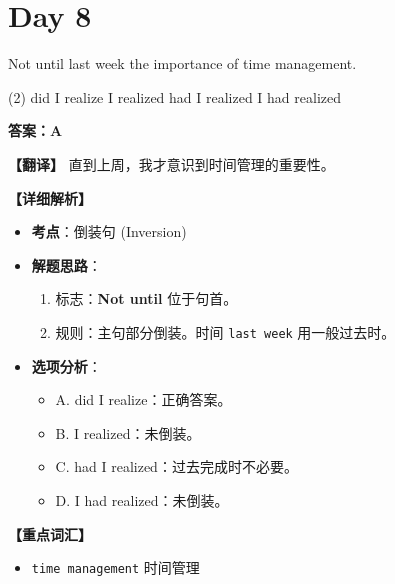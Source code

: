 \documentclass[11pt, a4paper]{article}
\newcommand{\analysis}[4]{
    \begin{solutionbox}
        \textbf{答案：#1}
        
        \textbf{【翻译】} #2
        
        \textbf{【详细解析】}
        #3
        
        \textbf{【重点词汇】}
        #4
    \end{solutionbox}
}
\newcommand{\blank}{\underline{\hspace{1.5cm}}}
\begin{document}
\section*{Day 8}
\begin{questions}
    \item Not until last week \blank the importance of time management.
    \begin{tasks}(2)
        \task did I realize \task I realized
        \task had I realized \task I had realized
    \end{tasks}
    \analysis{A}{直到上周，我才意识到时间管理的重要性。}{
        \begin{itemize}
            \item \textbf{考点}：倒装句 (Inversion)
            \item \textbf{解题思路}：
                \begin{enumerate}
                    \item 标志：\textbf{Not until} 位于句首。
                    \item 规则：主句部分倒装。时间 \texttt{last week} 用一般过去时。
                \end{enumerate}
            \item \textbf{选项分析}：
                \begin{itemize}
                    \item A. did I realize：正确答案。
                    \item B. I realized：未倒装。
                    \item C. had I realized：过去完成时不必要。
                    \item D. I had realized：未倒装。
                \end{itemize}
        \end{itemize}
    }{
        \begin{itemize}
            \item \texttt{time management} 时间管理
        \end{itemize}
    }


\end{questions}
\end{document}
